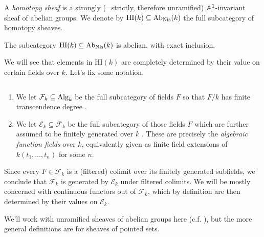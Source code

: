 \documentclass[11pt,openany]{book}
\providecommand{\HI}{\mathrm{HI}}
\begin{document}
\begin{definition}
A \textit{homotopy sheaf} is a strongly (=strictly, therefore unramified) $\mathbb{A}^1$-invariant sheaf of abelian groups. We denote by $\HI(k) \subseteq \Ab_\Nis(k)$ the full subcategory of homotopy sheaves.
\end{definition}


\begin{theorem} \cite[6.24]{Morel}
The subcategory $\HI(k) \subseteq \Ab_\Nis(k)$ is abelian, with exact inclusion.
\end{theorem}

We will see that elements in $\HI(k)$ are completely determined by their value on certain fields over $k$. Let's fix some notation.


\begin{notation} $\ $
\begin{enumerate}
    \item We let $\mathcal{F}_k \subseteq \mathrm{Alg}_k$ be the full subcategory of fields $F$ so that $F/k$ has finite transcendence degree \cite[p.~vi]{Morel}.
    \item We let $\mathcal{E}_k \subseteq \mathcal{F}_k$ be the full subcategory of those fields $F$ which are further assumed to be finitely generated over $k$ \cite[p.~43]{Deglise-finite-corr}. These are precisely the \textit{algebraic function fields} over $k$, equivalently given as finite field extensions of $k(t_1, \ldots, t_n)$ for some $n$.
\end{enumerate}
\end{notation}

\begin{remark} Since every $F \in \mathcal{F}_k$ is a (filtered) colimit over its finitely generated subfields, we conclude that $\mathcal{F}_k$ is generated by $\mathcal{E}_k$ under filtered colimits. We will be mostly concerned with continuous functors out of $\mathcal{F}_k$, which by definition are then determined by their values on $\mathcal{E}_k$.
\end{remark}


We'll work with unramified sheaves of abelian groups here (c.f. \cite[\S1.5]{Feld-thesis}), but the more general definitions are for sheaves of pointed sets.
\end{document}
